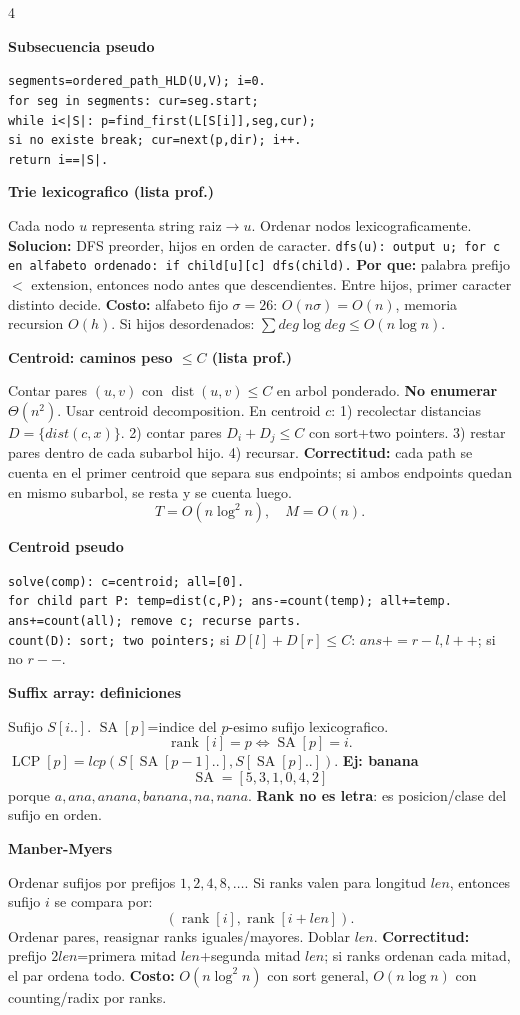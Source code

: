 \documentclass[8pt]{extarticle}
\newcommand{\blk}[2]{%
  \vspace{1.3pt}
  \noindent\colorbox{head}{\parbox{\linewidth-2\fboxsep}{\textbf{#1}}}\par
  {\footnotesize #2}\par
}
\newcommand{\bigO}{O}
\newcommand{\SA}{\operatorname{SA}}
\newcommand{\LCP}{\operatorname{LCP}}
\newcommand{\rankv}{\operatorname{rank}}
\begin{document}
\begin{multicols}{4}
\blk{Subsecuencia pseudo}{
\texttt{segments=ordered\_path\_HLD(U,V); i=0.}\\
\texttt{for seg in segments: cur=seg.start;}\\
\texttt{while i<|S|: p=find\_first(L[S[i]],seg,cur);}\\
\texttt{si no existe break; cur=next(p,dir); i++.}\\
\texttt{return i==|S|.}}

\blk{Trie lexicografico (lista prof.)}{
Cada nodo \(u\) representa string raiz\(\to u\). Ordenar nodos lexicograficamente.
\textbf{Solucion:} DFS preorder, hijos en orden de caracter.
\texttt{dfs(u): output u; for c en alfabeto ordenado: if child[u][c] dfs(child).}
\textbf{Por que:} palabra prefijo \(<\) extension, entonces nodo antes que descendientes. Entre hijos, primer caracter distinto decide.
\textbf{Costo:} alfabeto fijo \(\sigma=26\): \(\bigO(n\sigma)=\bigO(n)\), memoria recursion \(\bigO(h)\). Si hijos desordenados: \(\sum deg\log deg\le\bigO(n\log n)\).}

\blk{Centroid: caminos peso \(\le C\) (lista prof.)}{
Contar pares \((u,v)\) con \(\operatorname{dist}(u,v)\le C\) en arbol ponderado.
\textbf{No enumerar} \(\Theta(n^2)\). Usar centroid decomposition.
En centroid \(c\):
1) recolectar distancias \(D=\{dist(c,x)\}\).
2) contar pares \(D_i+D_j\le C\) con sort+two pointers.
3) restar pares dentro de cada subarbol hijo.
4) recursar.
\textbf{Correctitud:} cada path se cuenta en el primer centroid que separa sus endpoints; si ambos endpoints quedan en mismo subarbol, se resta y se cuenta luego.
\[
T=\bigO(n\log^2 n),\quad M=\bigO(n).
\]}

\blk{Centroid pseudo}{
\texttt{solve(comp): c=centroid; all=[0].}\\
\texttt{for child part P: temp=dist(c,P); ans-=count(temp); all+=temp.}\\
\texttt{ans+=count(all); remove c; recurse parts.}\\
\texttt{count(D): sort; two pointers;} si \(D[l]+D[r]\le C\): \(ans+=r-l,l++\); si no \(r--\).}

\blk{Suffix array: definiciones}{
Sufijo \(S[i..]\). \(\SA[p]\)=indice del \(p\)-esimo sufijo lexicografico.
\[
\rankv[i]=p \Leftrightarrow \SA[p]=i.
\]
\(\LCP[p]=lcp(S[\SA[p-1]..],S[\SA[p]..])\).
\textbf{Ej: banana}
\[
\SA=[5,3,1,0,4,2]
\]
porque \(a,ana,anana,banana,na,nana\).
\textbf{Rank no es letra}: es posicion/clase del sufijo en orden.}

\blk{Manber-Myers}{
Ordenar sufijos por prefijos \(1,2,4,8,\ldots\). Si ranks valen para longitud \(len\), entonces sufijo \(i\) se compara por:
\[
(\rankv[i],\rankv[i+len]).
\]
Ordenar pares, reasignar ranks iguales/mayores. Doblar \(len\).
\textbf{Correctitud:} prefijo \(2len\)=primera mitad \(len\)+segunda mitad \(len\); si ranks ordenan cada mitad, el par ordena todo.
\textbf{Costo:} \(\bigO(n\log^2 n)\) con sort general, \(\bigO(n\log n)\) con counting/radix por ranks.}


\end{multicols}
\end{document}

